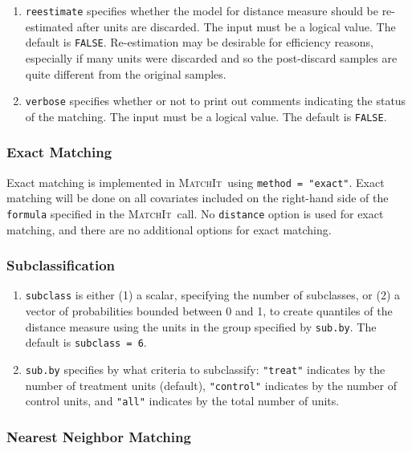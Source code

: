 \documentclass[oneside,letterpaper,titlepage]{article}
\newcommand{\MatchIt}{\textsc{MatchIt}}
\begin{document}
\begin{enumerate}
\item \texttt{reestimate} specifies whether the model for distance
  measure should be re-estimated after units are discarded. The input
  must be a logical value. The default is \texttt{FALSE}.
  Re-estimation may be desirable for efficiency reasons, especially if
  many units were discarded and so the post-discard samples are quite
  different from the original samples.

\item \texttt{verbose} specifies whether or not to print out comments
  indicating the status of the matching. The input must be a logical
  value. The default is \texttt{FALSE}.
\end{enumerate}

\subsubsection{Exact Matching}
\label{subsubsec:inputs-exact}

Exact matching is implemented in \MatchIt\ using \texttt{method =
  "exact"}.  Exact matching will be done on all covariates included on
the right-hand side of the \texttt{formula} specified in the \MatchIt\
call.  No \texttt{distance} option is used for exact matching, and
there are no additional options for exact matching.

\subsubsection{Subclassification}
\label{subsubsec:inputs-subclass}

\begin{enumerate}
\item \texttt{subclass} is either (1) a scalar, specifying the number
  of subclasses, or (2) a vector of probabilities bounded between 0
  and 1, to create quantiles of the distance measure using the units
  in the group specified by \texttt{sub.by}.  The default is
  \texttt{subclass = 6}.
\item \texttt{sub.by} specifies by what criteria to subclassify:
  \texttt{"treat"} indicates by the number of treatment units
  (default), \texttt{"control"} indicates by the number of control
  units, and \texttt{"all"} indicates by the total number of units.
\end{enumerate}

\subsubsection{Nearest Neighbor Matching}
\label{subsubsec:inputs-nearest}
\end{document}
